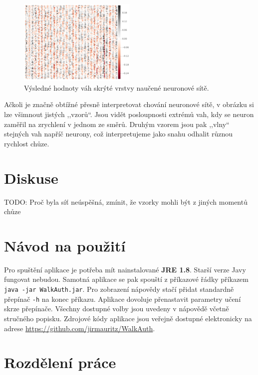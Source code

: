 \documentclass[a4paper, 10pt, twocolumn]{article}
\begin{document}
\begin{figure}[ht]
\centering
\includegraphics[width=0.5\textwidth]{img/weights.pdf}
\caption{Výsledné hodnoty váh skrýté vrstvy naučené neuronové sítě.}
\label{weighs}
\end{figure}


Ačkoli je značně obtížné přesně interpretovat chování neuronové sítě, v obrázku si lze všimnout jistých ,,vzorů``. Jsou vidět posloupnosti extrémů vah, kdy se neuron zaměřil na zrychlení v jednom ze směrů. Druhým vzorem jsou pak ,,vlny`` stejných vah napříč neurony, což interpretujeme jako snahu odhalit různou rychlost chůze.
\section{Diskuse}
    TODO: Proč byla síť neúspěšná, zmínit, že vzorky mohli být z jiných momentů chůze
    
\appendix
\section{Návod na použití}
Pro spuštění aplikace je potřeba mít nainstalované \textbf{JRE 1.8}. Starší verze Javy fungovat nebudou. Samotná aplikace se pak spouští z příkazové řádky příkazem \texttt{java -jar WalkAuth.jar}. Pro zobrazení nápovědy stačí přidat standardně přepínač \texttt{-h} na konec příkazu. Aplikace dovoluje přenastavit parametry učení skrze přepínače. Všechny dostupné volby jsou uvedeny v nápovědě včetně stručného popisku. Zdrojové kódy aplikace jsou veřejně dostupné elektronicky na adrese \url{https://github.com/jirmauritz/WalkAuth}.

\section{Rozdělení práce}
\end{document}
